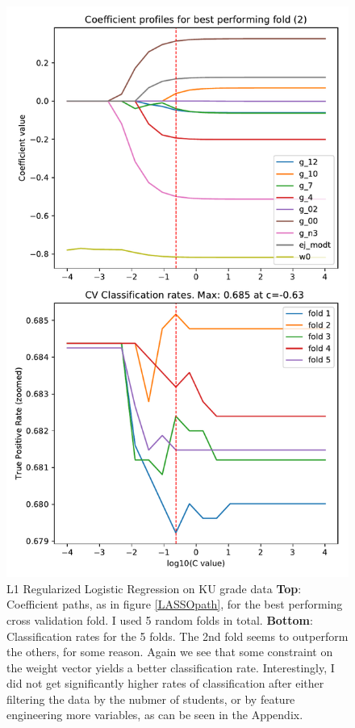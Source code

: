 \documentclass[%
 reprint,
 amsmath,amssymb,
 aps,
]{revtex4-1}
\begin{document}
\begin{figure}
  \includegraphics[width=0.9\linewidth]{../figs/LogRegCV_KU.pdf}
  \caption{L1 Regularized Logistic Regression on KU grade data
  \textbf{Top}: Coefficient paths, as in figure \ref{LASSOpath}, for the best performing cross validation fold.
  I used 5 random folds in total.
  \textbf{Bottom}: Classification rates for the 5 folds. The 2nd fold seems to outperform the others, for some reason.
  Again we see that some constraint on the weight vector yields a better classification rate.
  Interestingly, I did not get significantly higher rates of classification after either filtering the data by the nubmer of students, or by feature engineering more variables, as can be seen in the Appendix.
  }
  \label{}
\end{figure}
\end{document}
